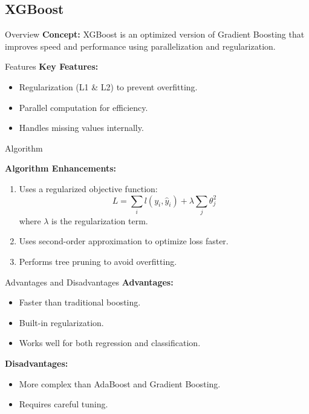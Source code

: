 \documentclass[serif, aspectratio=169]{beamer}
\begin{document}
\subsection{XGBoost}

\begin{frame}{Overview}
\textbf{Concept:} XGBoost is an optimized version of Gradient Boosting that improves speed and performance using parallelization and regularization.
\end{frame}

\begin{frame}{Features}
\textbf{Key Features:}
\begin{itemize}
    \item Regularization (L1 \& L2) to prevent overfitting.
    \item Parallel computation for efficiency.
    \item Handles missing values internally.
\end{itemize}
\end{frame}

\begin{frame}{Algorithm}

\textbf{Algorithm Enhancements:}
\begin{enumerate}
    \item Uses a regularized objective function:
    \begin{equation}
        L = \sum_{i} l(y_i, \hat{y}_i) + \lambda \sum_{j} \theta_j^2
    \end{equation}
    where $\lambda$ is the regularization term.
    \item Uses second-order approximation to optimize loss faster.
    \item Performs tree pruning to avoid overfitting.
\end{enumerate}
\end{frame}

\begin{frame}{Advantages and Disadvantages}
\textbf{Advantages:}
\begin{itemize}
    \item Faster than traditional boosting.
    \item Built-in regularization.
    \item Works well for both regression and classification.
\end{itemize}

\textbf{Disadvantages:}
\begin{itemize}
    \item More complex than AdaBoost and Gradient Boosting.
    \item Requires careful tuning.
\end{itemize}
\end{frame}
\end{document}
